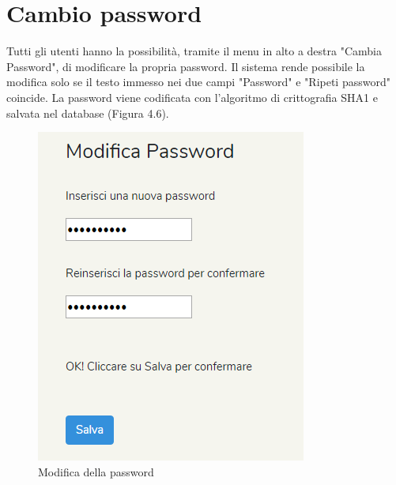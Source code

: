 \documentclass[twoside]{supsistudent}
\begin{document}
\section{Cambio password}
Tutti gli utenti hanno la possibilità, tramite il menu in alto a destra "Cambia Password", di modificare la propria password.
Il sistema rende possibile la modifica solo se il testo immesso nei due campi "Password" e "Ripeti password" coincide.
La password viene codificata con l'algoritmo di crittografia SHA1 e salvata nel database (Figura 4.6).\\
\begin{figure}[!h]
\centering
\includegraphics[scale=0.6]{saniwiki_modificapassword.png}
\caption{Modifica della password}
\end{figure}
\end{document}
